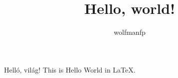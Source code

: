 \documentclass[a4paper]{article}
\title{Hello, world!}
\author{wolfmanfp}
\begin{document}
	\maketitle
	\center
	\huge
	Helló, világ!
	\flushleft
	\large
	This is Hello World in \LaTeX.
\end{document}
